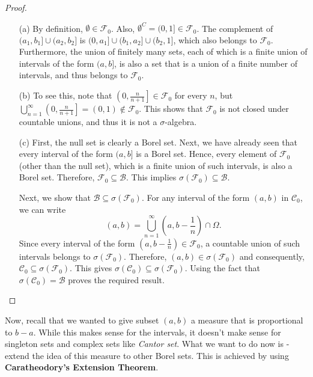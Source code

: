 \begin{proof}
    \begin{itemize}
        \item[(a)] By definition, \( \emptyset \in \mathcal{F}_0 \). Also, \( \emptyset^C = (0, 1] \in \mathcal{F}_0 \). The complement of \( (a_1, b_1] \cup (a_2, b_2] \) is \( (0, a_1] \cup (b_1, a_2] \cup (b_2, 1] \), which also belongs to \( \mathcal{F}_0 \). \\ Furthermore, the union of finitely many sets, each of which is a finite union of intervals of the form \( (a, b] \), is also a set that is a union of a finite number of intervals, and thus belongs to \( \mathcal{F}_0 \).
        
        \item[(b)] To see this, note that \( \left(0, \frac{n}{n+1}\right] \in \mathcal{F}_0 \) for every \( n \), but \( \bigcup_{n=1}^{\infty} \left(0, \frac{n}{n+1}\right] = (0, 1) \notin \mathcal{F}_0 \). This shows that \( \mathcal{F}_0 \) is not closed under countable unions, and thus it is not a \( \sigma \)-algebra.
    
        \item[(c)] First, the null set is clearly a Borel set. Next, we have already seen that every interval of the form \( (a, b] \) is a Borel set. Hence, every element of \( \mathcal{F}_0 \) (other than the null set), which is a finite union of such intervals, is also a Borel set. Therefore, \( \mathcal{F}_0 \subseteq \mathcal{B} \). This implies \( \sigma(\mathcal{F}_0) \subseteq \mathcal{B} \).
    
        Next, we show that \( \mathcal{B} \subseteq \sigma(\mathcal{F}_0) \). For any interval of the form \( (a, b) \) in \( \mathcal{C}_0 \), we can write
        \[
        (a, b) = \bigcup_{n=1}^{\infty} \left(a, b - \frac{1}{n}\right) \cap \Omega.
        \]
        Since every interval of the form \( \left(a, b - \frac{1}{n}\right) \in \mathcal{F}_0 \), a countable union of such intervals belongs to \( \sigma(\mathcal{F}_0) \). Therefore, \( (a, b) \in \sigma(\mathcal{F}_0) \) and consequently, \( \mathcal{C}_0 \subseteq \sigma(\mathcal{F}_0) \). This gives \( \sigma(\mathcal{C}_0) \subseteq \sigma(\mathcal{F}_0) \). Using the fact that \( \sigma(\mathcal{C}_0) = \mathcal{B} \) proves the required result.
    \end{itemize}
    
\end{proof}


Now, recall that we wanted to give subset $(a, b)$ a measure that is proportional to $b-a$. While this makes sense for the intervals, it doesn't make sense for singleton sets and complex sets like \textit{Cantor set}. What we want to do now is - extend the idea of this measure to other Borel sets. This is achieved by using \textbf{Caratheodory's Extension Theorem}.

